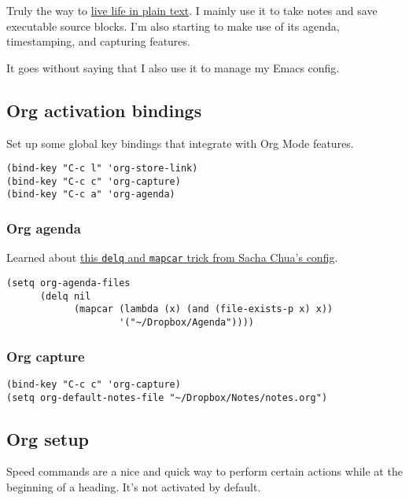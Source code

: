 \documentclass[11pt]{article}
\begin{document}
Truly the way to \href{http://orgmode.org/}{live life in plain text}. I mainly use it to take
notes and save executable source blocks. I'm also starting to make use
of its agenda, timestamping, and capturing features.

It goes without saying that I also use it to manage my Emacs config.

\subsection{Org activation bindings}
\label{sec-10-1}

Set up some global key bindings that integrate with Org Mode features.

\begin{verbatim}
(bind-key "C-c l" 'org-store-link)
(bind-key "C-c c" 'org-capture)
(bind-key "C-c a" 'org-agenda)
\end{verbatim}

\subsubsection{Org agenda}
\label{sec-10-1-1}

Learned about \href{https://github.com/sachac/.emacs.d/blob/83d21e473368adb1f63e582a6595450fcd0e787c/Sacha.org#org-agenda}{this \texttt{delq} and \texttt{mapcar} trick from Sacha Chua's config}.

\begin{verbatim}
(setq org-agenda-files
      (delq nil
            (mapcar (lambda (x) (and (file-exists-p x) x))
                    '("~/Dropbox/Agenda"))))
\end{verbatim}

\subsubsection{Org capture}
\label{sec-10-1-2}

\begin{verbatim}
(bind-key "C-c c" 'org-capture)
(setq org-default-notes-file "~/Dropbox/Notes/notes.org")
\end{verbatim}

\subsection{Org setup}
\label{sec-10-2}

Speed commands are a nice and quick way to perform certain actions
while at the beginning of a heading. It's not activated by default.
\end{document}
